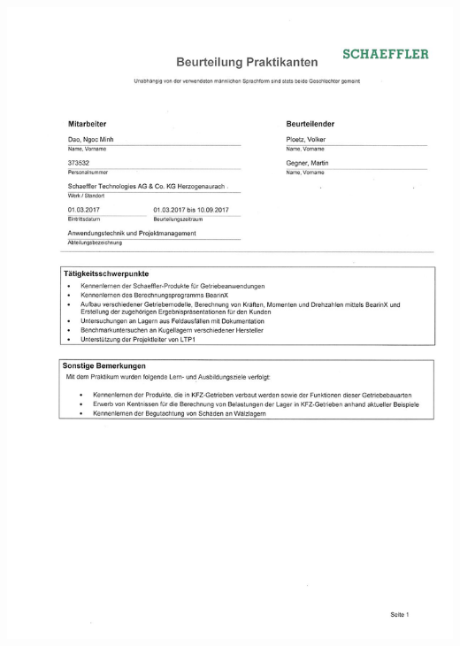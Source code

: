 \documentclass[12pt,a4paper]{scrartcl}
\begin{document}
\newpage
{}
\includegraphics[width=\linewidth, keepaspectratio]{./zeugnisse/praktikumzeugnis_1.jpg}
\end{document}
